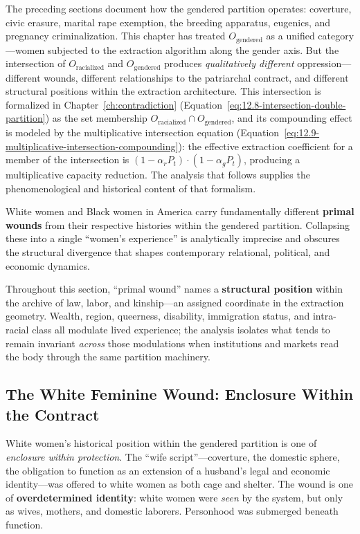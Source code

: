 The preceding sections document how the gendered partition operates: coverture, civic erasure, marital rape exemption, the breeding apparatus, eugenics, and pregnancy criminalization. This chapter has treated $O_{\text{gendered}}$ as a unified category---women subjected to the extraction algorithm along the gender axis. But the intersection of $O_{\text{racialized}}$ and $O_{\text{gendered}}$ produces \textit{qualitatively different} oppression---different wounds, different relationships to the patriarchal contract, and different structural positions within the extraction architecture. This intersection is formalized in Chapter~\ref{ch:contradiction} (Equation~\ref{eq:12.8-intersection-double-partition}) as the set membership $O_{\text{racialized}} \cap O_{\text{gendered}}$, and its compounding effect is modeled by the multiplicative intersection equation (Equation~\ref{eq:12.9-multiplicative-intersection-compounding}): the effective extraction coefficient for a member of the intersection is $(1 - \alpha_r P_t) \cdot (1 - \alpha_g P_t)$, producing a multiplicative capacity reduction. The analysis that follows supplies the phenomenological and historical content of that formalism.

White women and Black women in America carry fundamentally different \textbf{primal wounds} from their respective histories within the gendered partition. Collapsing these into a single ``women's experience'' is analytically imprecise and obscures the structural divergence that shapes contemporary relational, political, and economic dynamics.

Throughout this section, ``primal wound'' names a \textbf{structural position} within the archive of law, labor, and kinship---an assigned coordinate in the extraction geometry. Wealth, region, queerness, disability, immigration status, and intra-racial class all modulate lived experience; the analysis isolates what tends to remain invariant \textit{across} those modulations when institutions and markets read the body through the same partition machinery.

\subsection{The White Feminine Wound: Enclosure Within the Contract}

White women's historical position within the gendered partition is one of \textit{enclosure within protection}. The ``wife script''---coverture, the domestic sphere, the obligation to function as an extension of a husband's legal and economic identity---was offered to white women as both cage and shelter. The wound is one of \textbf{overdetermined identity}: white women were \textit{seen} by the system, but only as wives, mothers, and domestic laborers. Personhood was submerged beneath function.

